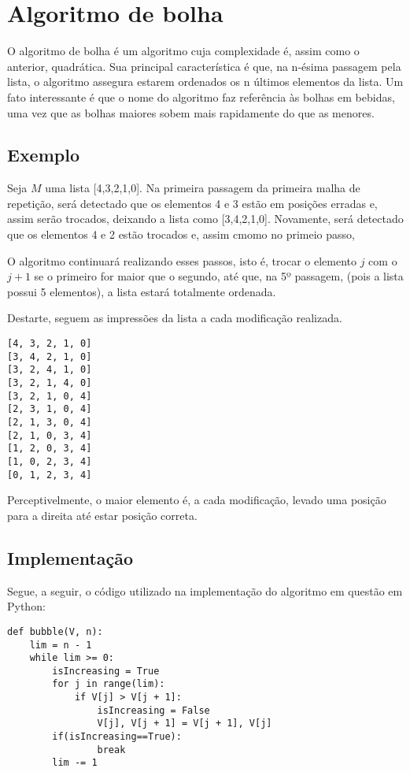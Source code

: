 \section{Algoritmo de bolha}
O algoritmo de bolha é um algoritmo cuja complexidade é, assim como o anterior, quadrática. Sua principal característica é que, na n-ésima passagem pela lista, o algoritmo assegura estarem ordenados os n últimos elementos da lista.
Um fato interessante é que o nome do algoritmo faz referência às bolhas em bebidas, uma vez que as bolhas maiores sobem mais rapidamente do que as menores.


\subsection{Exemplo}
Seja $M$ uma lista [4,3,2,1,0].
Na primeira passagem da primeira malha de repetição, será detectado que os elementos 4 e 3 estão em posições erradas e, assim serão trocados, deixando a lista como [3,4,2,1,0]. Novamente, será detectado que os elementos 4 e 2 estão trocados e, assim cmomo no primeio passo, 

O algoritmo continuará realizando esses passos, isto é, trocar o elemento $j$ com o $j+1$ se o primeiro for maior que o segundo, até que, na 5º passagem, (pois a lista possui 5 elementos), a lista estará totalmente ordenada.

Destarte, seguem as impressões da lista a cada modificação realizada. 

\begin{lstlisting}
[4, 3, 2, 1, 0]
[3, 4, 2, 1, 0]
[3, 2, 4, 1, 0]
[3, 2, 1, 4, 0]
[3, 2, 1, 0, 4]
[2, 3, 1, 0, 4]
[2, 1, 3, 0, 4]
[2, 1, 0, 3, 4]
[1, 2, 0, 3, 4]
[1, 0, 2, 3, 4]
[0, 1, 2, 3, 4]
\end{lstlisting}

Perceptivelmente, o maior elemento é, a cada modificação, levado uma posição para a direita até estar posição correta. 
\newpage
\subsection{Implementação}
Segue, a seguir, o código utilizado na implementação do algoritmo em questão em Python:

\begin{lstlisting}
def bubble(V, n):
    lim = n - 1
    while lim >= 0:
        isIncreasing = True
        for j in range(lim):
            if V[j] > V[j + 1]:
                isIncreasing = False
                V[j], V[j + 1] = V[j + 1], V[j]
        if(isIncreasing==True): 
                break
        lim -= 1
\end{lstlisting}


